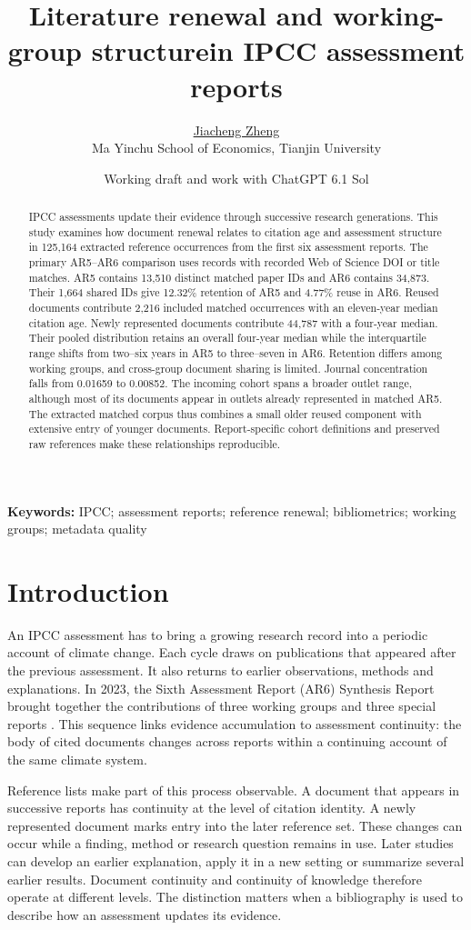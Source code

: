 \documentclass[11pt,a4paper]{article}
\title{Literature renewal and working-group structure\newline in IPCC assessment reports}
\author{\href{https://karcen.github.io/}{Jiacheng Zheng}\\\small Ma Yinchu School of Economics, Tianjin University}
\date{Working draft and work with ChatGPT 6.1 Sol}
\begin{document}
\maketitle
\begin{abstract}
IPCC assessments update their evidence through successive research generations. This study examines how document renewal relates to citation age and assessment structure in 125,164 extracted reference occurrences from the first six assessment reports. The primary AR5--AR6 comparison uses records with recorded Web of Science DOI or title matches. AR5 contains 13,510 distinct matched paper IDs and AR6 contains 34,873. Their 1,664 shared IDs give 12.32\% retention of AR5 and 4.77\% reuse in AR6. Reused documents contribute 2,216 included matched occurrences with an eleven-year median citation age. Newly represented documents contribute 44,787 with a four-year median. Their pooled distribution retains an overall four-year median while the interquartile range shifts from two--six years in AR5 to three--seven in AR6. Retention differs among working groups, and cross-group document sharing is limited. Journal concentration falls from 0.01659 to 0.00852. The incoming cohort spans a broader outlet range, although most of its documents appear in outlets already represented in matched AR5. The extracted matched corpus thus combines a small older reused component with extensive entry of younger documents. Report-specific cohort definitions and preserved raw references make these relationships reproducible.
\end{abstract}
\noindent\textbf{Keywords:} IPCC; assessment reports; reference renewal; bibliometrics; working groups; metadata quality

\section{Introduction}
An IPCC assessment has to bring a growing research record into a periodic account of climate change. Each cycle draws on publications that appeared after the previous assessment. It also returns to earlier observations, methods and explanations. In 2023, the Sixth Assessment Report (AR6) Synthesis Report brought together the contributions of three working groups and three special reports \citep{ipcc2023synthesis}. This sequence links evidence accumulation to assessment continuity: the body of cited documents changes across reports within a continuing account of the same climate system.

Reference lists make part of this process observable. A document that appears in successive reports has continuity at the level of citation identity. A newly represented document marks entry into the later reference set. These changes can occur while a finding, method or research question remains in use. Later studies can develop an earlier explanation, apply it in a new setting or summarize several earlier results. Document continuity and continuity of knowledge therefore operate at different levels. The distinction matters when a bibliography is used to describe how an assessment updates its evidence.
\end{document}
